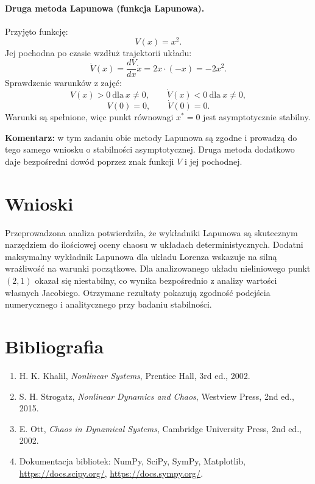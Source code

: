\documentclass[12pt,a4paper]{article}
\begin{document}
\paragraph{Druga metoda Lapunowa (funkcja Lapunowa).}
Przyj\k{e}to funkcj\k{e}:
\begin{equation}
    V(x)=x^2.
\end{equation}
Jej pochodna po czasie wzd\l{}u\.z trajektorii uk\l{}adu:
\begin{equation}
    \dot{V}(x)=\frac{dV}{dx}\dot{x}=2x\cdot(-x)=-2x^2.
\end{equation}
Sprawdzenie warunk\'ow z zaj\k{e}\'c:
\begin{equation}
    V(x)>0\ \text{dla}\ x\neq 0,\qquad \dot{V}(x)<0\ \text{dla}\ x\neq 0,
\end{equation}
\begin{equation}
    V(0)=0,\qquad \dot{V}(0)=0.
\end{equation}
Warunki s\k{a} spe\l{}nione, wi\k{e}c punkt r\'ownowagi $x^\ast=0$ jest asymptotycznie stabilny.

\textbf{Komentarz:} w tym zadaniu obie metody Lapunowa s\k{a} zgodne i prowadz\k{a} do tego samego wniosku o stabilno\'sci asymptotycznej. Druga metoda dodatkowo daje bezpo\'sredni dow\'od poprzez znak funkcji $V$ i jej pochodnej.

\section{Wnioski}
Przeprowadzona analiza potwierdzi\l{}a, \.ze wyk\l{}adniki Lapunowa s\k{a} skutecznym narz\k{e}dziem do ilo\'sciowej oceny chaosu w uk\l{}adach deterministycznych. Dodatni maksymalny wyk\l{}adnik Lapunowa dla uk\l{}adu Lorenza wskazuje na siln\k{a} wra\.zliwo\'s\'c na warunki pocz\k{a}tkowe. Dla analizowanego uk\l{}adu nieliniowego punkt $(2,1)$ okaza\l{} si\k{e} niestabilny, co wynika bezpo\'srednio z analizy warto\'sci w\l{}asnych Jacobiego. Otrzymane rezultaty pokazuj\k{a} zgodno\'s\'c podej\'scia numerycznego i analitycznego przy badaniu stabilno\'sci.

\section{Bibliografia}
\begin{enumerate}
    \item H. K. Khalil, \textit{Nonlinear Systems}, Prentice Hall, 3rd ed., 2002.
    \item S. H. Strogatz, \textit{Nonlinear Dynamics and Chaos}, Westview Press, 2nd ed., 2015.
    \item E. Ott, \textit{Chaos in Dynamical Systems}, Cambridge University Press, 2nd ed., 2002.
    \item Dokumentacja bibliotek: NumPy, SciPy, SymPy, Matplotlib, \url{https://docs.scipy.org/}, \url{https://docs.sympy.org/}.
\end{enumerate}
\end{document}
